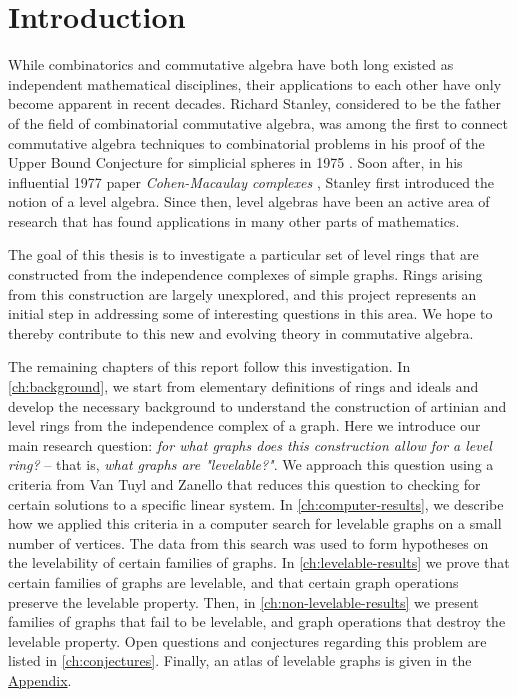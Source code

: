 
\chapter{Introduction} %

\label{ch:introduction} %

While combinatorics and commutative algebra have both long existed as independent mathematical disciplines, their applications to each other have only become apparent in recent decades. Richard Stanley, considered to be the father of the field of combinatorial commutative algebra, was among the first to connect commutative algebra techniques to combinatorial problems in his proof of the Upper Bound Conjecture for simplicial spheres in 1975 \cite{Stanley1975}. Soon after, in his influential 1977 paper \textit{Cohen-Macaulay complexes} \cite{Stanley1977}, Stanley first introduced the notion of a level algebra. Since then, level algebras have been an active area of research that has found applications in many other parts of mathematics. 

The goal of this thesis is to investigate a particular set of level rings that are constructed from the independence complexes of simple graphs. Rings arising from this construction are largely unexplored, and this project represents an initial step in addressing some of interesting questions in this area. We hope to thereby contribute to this new and evolving theory in commutative algebra.

The remaining chapters of this report follow this investigation. In \autoref{ch:background}, we start from elementary definitions of rings and ideals and develop the necessary background to understand the construction of artinian and level rings from the independence complex of a graph. Here we introduce our main research question: \textit{for what graphs does this construction allow for a level ring?} -- that is, \textit{what graphs are "levelable?"}. We approach this question using a criteria from Van Tuyl and Zanello \cite{VanTuyl2010} that reduces this question to checking for certain solutions to a specific linear system. In \autoref{ch:computer-results}, we describe how we applied this criteria in a computer search for levelable graphs on a small number of vertices. The data from this search was used to form hypotheses on the levelability of certain families of graphs. In \autoref{ch:levelable-results} we prove that certain families of graphs are levelable, and that certain graph operations preserve the levelable property. Then, in \autoref{ch:non-levelable-results} we present families of graphs that fail to be levelable, and graph operations that destroy the levelable property. Open questions and conjectures regarding this problem are listed in \autoref{ch:conjectures}. Finally, an atlas of levelable graphs is given in the \hyperref[ch:appendix]{Appendix}. 


